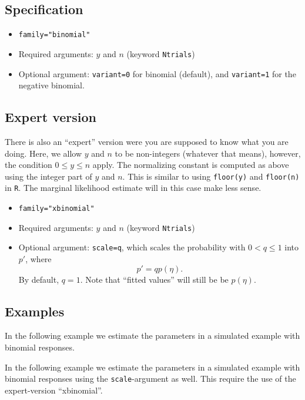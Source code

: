 \documentclass[a4paper,11pt]{article}
\begin{document}
\subsection*{Specification}

\begin{itemize}
\item \texttt{family="binomial"}
\item Required arguments: $y$ and $n$ (keyword \texttt{Ntrials})
\item Optional argument: \texttt{variant=0} for binomial (default),
    and \texttt{variant=1} for the negative binomial.
\end{itemize}


\subsection*{Expert version}

There is also an ``expert'' version were you are supposed to know what
you are doing. Here, we allow $y$ and $n$ to be non-integers (whatever
that means), however, the condition $0\le y \le n$ apply. The
normalizing constant is computed as above using the integer part of
$y$ and $n$. This is similar to using \verb|floor(y)| and
\verb|floor(n)| in \verb|R|. The marginal likelihood estimate will in
this case make less sense.
\begin{itemize}
\item \texttt{family="xbinomial"}
\item Required arguments: $y$ and $n$ (keyword \texttt{Ntrials})
\item Optional argument: \texttt{scale=q}, which scales the
    probability with $0<q\le1$ into $p'$, where
    \begin{displaymath}
        p' = q p(\eta).
    \end{displaymath}
    By default, $q=1$. Note that ``fitted values'' will still be be
    $p(\eta)$. 
\end{itemize}


\subsection*{Examples}

In the following example we estimate the parameters in a simulated
example with binomial responses.


In the following example we estimate the parameters in a simulated
example with binomial responses using the \texttt{scale}-argument as
well. This require the use of the expert-version ``xbinomial''.

\end{document}
